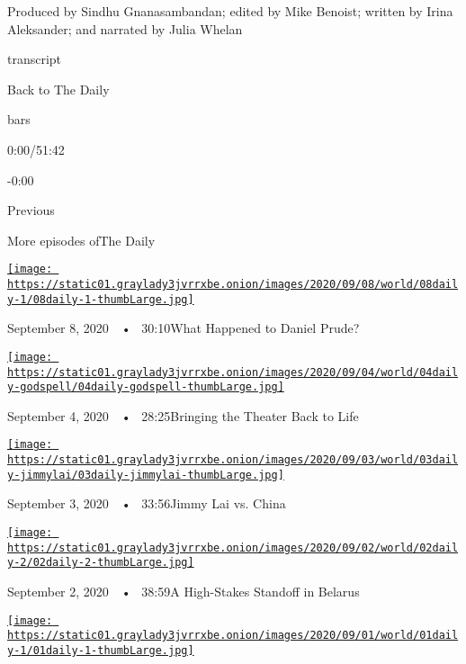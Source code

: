 Produced by Sindhu Gnanasambandan; edited by Mike Benoist; written by
Irina Aleksander; and narrated by Julia Whelan

transcript

Back to The Daily

bars

0:00/51:42

-0:00

Previous

More episodes ofThe Daily

\href{https://www.nytimes3xbfgragh.onion/2020/09/08/podcasts/the-daily/Daniel-Prude-BLM-police.html?action=click\&module=audio-series-bar\&region=header\&pgtype=Article}{\texttt{[image: https://static01.graylady3jvrrxbe.onion/images/2020/09/08/world/08daily-1/08daily-1-thumbLarge.jpg]}}

September 8, 2020~~•~ 30:10What Happened to Daniel Prude?

\href{https://www.nytimes3xbfgragh.onion/2020/09/04/podcasts/the-daily/Godspell-theater-coronavirus.html?action=click\&module=audio-series-bar\&region=header\&pgtype=Article}{\texttt{[image: https://static01.graylady3jvrrxbe.onion/images/2020/09/04/world/04daily-godspell/04daily-godspell-thumbLarge.jpg]}}

September 4, 2020~~•~ 28:25Bringing the Theater Back to Life

\href{https://www.nytimes3xbfgragh.onion/2020/09/03/podcasts/the-daily/hong-kong-china-jimmy-lai.html?action=click\&module=audio-series-bar\&region=header\&pgtype=Article}{\texttt{[image: https://static01.graylady3jvrrxbe.onion/images/2020/09/03/world/03daily-jimmylai/03daily-jimmylai-thumbLarge.jpg]}}

September 3, 2020~~•~ 33:56Jimmy Lai vs. China

\href{https://www.nytimes3xbfgragh.onion/2020/09/02/podcasts/the-daily/belarus-protests-lukashenko.html?action=click\&module=audio-series-bar\&region=header\&pgtype=Article}{\texttt{[image: https://static01.graylady3jvrrxbe.onion/images/2020/09/02/world/02daily-2/02daily-2-thumbLarge.jpg]}}

September 2, 2020~~•~ 38:59A High-Stakes Standoff in Belarus

\href{https://www.nytimes3xbfgragh.onion/2020/09/01/podcasts/the-daily/joe-biden-protests-trump.html?action=click\&module=audio-series-bar\&region=header\&pgtype=Article}{\texttt{[image: https://static01.graylady3jvrrxbe.onion/images/2020/09/01/world/01daily-1/01daily-1-thumbLarge.jpg]}}


